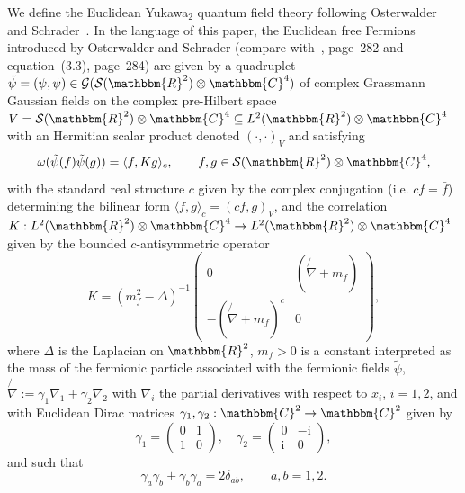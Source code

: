 \documentclass[11pt]{article}
\newcommand{\assign}{:=}
\newcommand{\mathi}{\mathrm{i}}
\begin{document}
We define the Euclidean Yukawa$_2$ quantum field theory following Osterwalder
and Schrader~{\cite{osterwalder_euclidean_1973-2}}. In the language of this
paper, the Euclidean free Fermions introduced by Osterwalder and Schrader
(compare with~{\cite{osterwalder_euclidean_1973-2}}, page~282 and
equation~(3.3), page~284) are given by a quadruplet $\tilde{\psi} = (\psi,
\bar{\psi}) \in \mathcal{G} (\mathcal{S} (\mathbbm{R}^2) \otimes \mathbbm{C}^4)$
of complex Grassmann Gaussian fields on the complex pre-Hilbert space $V
=\mathcal{S} (\mathbbm{R}^2) \otimes \mathbbm{C}^4 \subseteq L^2 (\mathbbm{R}^2)
\otimes \mathbbm{C}^4$ with an Hermitian scalar product denoted $(\cdot,
\cdot)_V$ and satisfying
\begin{equation}
  \omega (\tilde{\psi} (f) \tilde{\psi} (g)) = \langle f, K g \rangle_c,
  \label{eq:free-corrrelation} \qquad f, g \in \mathcal{S} (\mathbbm{R}^2)
  \otimes \mathbbm{C}^4,
\end{equation}
with the standard real structure $c$ given by the complex conjugation (i.e. $c
f = \bar{f}$) determining the bilinear form $\langle f, g \rangle_c = (c f,
g)_V$, and the correlation $K : L^2 (\mathbbm{R}^2) \otimes \mathbbm{C}^4
\rightarrow L^2 (\mathbbm{R}^2) \otimes \mathbbm{C}^4$ given by the bounded
$c$-antisymmetric operator
\begin{equation}
  K = (m_f^2 - \Delta)^{- 1} \left(\begin{array}{cc}
    0 & \left( \not{\nabla} + m_f \right)\\
    - \left( \not{\nabla} + m_f \right)^c & 0
  \end{array}\right), \label{eq:matrixK}
\end{equation}
where $\Delta$ is the Laplacian on $\mathbbm{R}^2$, $m_f > 0$ is a constant
interpreted as the mass of the fermionic particle associated with the
fermionic fields $\tilde{\psi}$, $\not{\nabla} \assign \gamma_1 \nabla_1 +
\gamma_2 \nabla_2$ with $\nabla_i$ the partial derivatives with respect to
$x_i$, $i = 1, 2$, and with Euclidean Dirac matrices $\gamma_1, \gamma_2 :
\mathbbm{C}^2 \rightarrow \mathbbm{C}^2$ given by
\[ \gamma_1 = \left(\begin{array}{cc}
     0 & 1\\
     1 & 0
   \end{array}\right), \quad \gamma_2 = \left(\begin{array}{cc}
     0 & - \mathi\\
     \mathi & 0
   \end{array}\right), \]
and such that
\[ \gamma_a \gamma_b + \gamma_b \gamma_a = 2 \delta_{a b}, \qquad a, b = 1, 2.
\]
\end{document}
